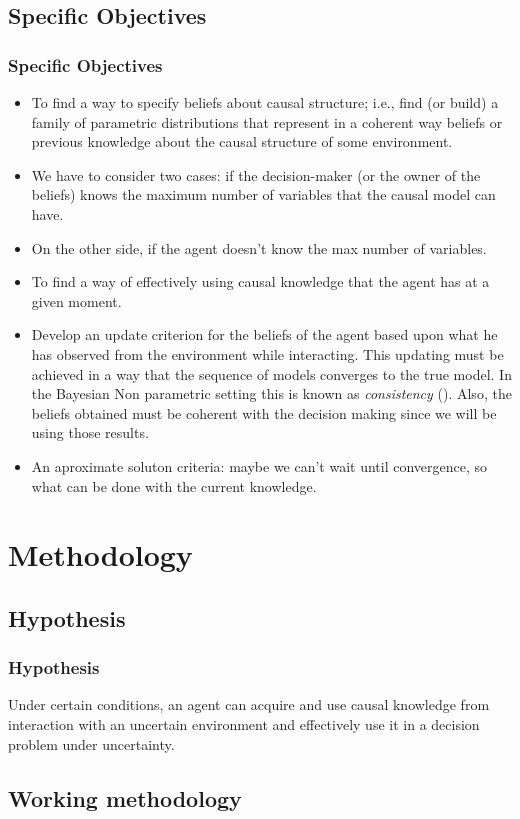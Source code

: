 \documentclass{beamer}
\theoremstyle{plain}
\begin{document}
	\subsection{Specific Objectives}
	\begin{frame}[allowframebreaks]
	\frametitle{Specific Objectives}
	\begin{itemize}
\item To find a way to specify beliefs about causal structure; i.e., find (or build) a family of parametric distributions that represent in a coherent way beliefs or previous knowledge about the causal structure of some environment.
\item  We have to consider two cases: if the decision-maker (or the owner of the beliefs) knows the maximum number of variables that the causal model can have.
\item On the other side, if the agent doesn't know the max number of variables.
\item To find a way of effectively using causal knowledge that the agent has at a given moment.
\item Develop an update criterion for the beliefs of the agent based upon what he has observed from the environment while interacting. This updating must be achieved in a way that the sequence of models converges to the true model. In the Bayesian Non parametric setting this is known as \textit{consistency} (\cite{ghosal2017fundamentals}). Also, the beliefs obtained must be coherent with the decision making since we will be using those results. 
\item An aproximate soluton criteria: maybe we can't wait until convergence, so what can be done with the current knowledge.
\end{itemize}
	\end{frame}
\section{Methodology}
	\subsection{Hypothesis}
	\begin{frame}
	\frametitle{Hypothesis}
	Under certain conditions, an agent can acquire and use causal knowledge from interaction with an uncertain environment and effectively use it in a decision problem under uncertainty.
	\end{frame}
	\subsection{Working methodology}
\end{document}
